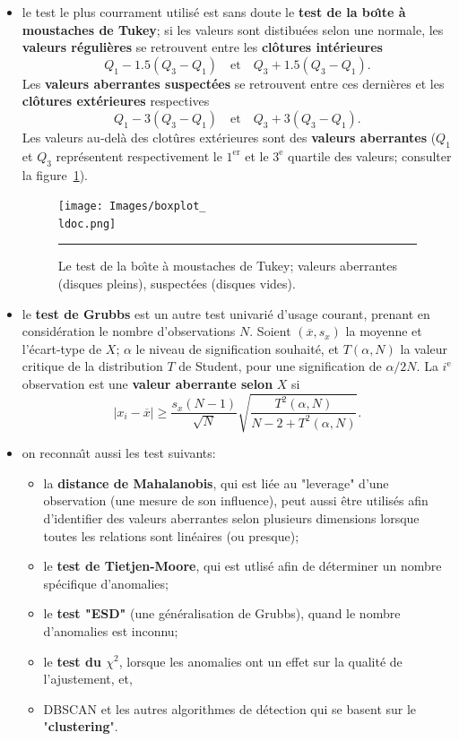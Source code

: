 \begin{itemize}[noitemsep]
\item le test le plus courrament utilis\'e est sans doute le  \textbf{test de la bo\^{\i}te \`a moustaches de Tukey}; si les valeurs sont distibu\'ees selon une normale, les \textbf{valeurs r\'e\-gu\-li\-\`eres} se retrouvent entre les \textbf{cl\^otures int\'erieures} $$Q_1-1.5(Q_3-Q_1) \quad\mbox{et}\quad Q_3+1.5(Q_3-Q_1).$$ Les \textbf{valeurs aberrantes suspect\'ees} se retrouvent entre ces derni\`eres et les \textbf{cl\^otures ext\'erieures} respectives 
$$Q_1-3(Q_3-Q_1) \quad\mbox{et}\quad Q_3+3(Q_3-Q_1).$$
Les valeurs au-del\`a des clot\^ures ext\'erieures sont des \textbf{valeurs aberrantes} ($Q_1$ et $Q_3$ repr\'esentent respectivement le $1^{\textrm{er}}$ et le $3^{\textrm{e}}$ quartile des valeurs; consulter la figure~\ref{fig:boxplot}).
\begin{figure}[t]
\centering
\texttt{[image: Images/boxplot\_\\ldoc.png]}
\caption{\small Le test de la bo\^{\i}te \`a moustaches de Tukey; valeurs aberrantes (disques pleins), suspect\'ees (disques vides).}
\hrule\label{fig:boxplot}
\end{figure}
\afterpage{\FloatBarrier}
\item le \textbf{test de Grubbs} est un autre test univari\'e d'usage courant, prenant en consid\'eration le nombre d'ob\-ser\-va\-tions $N$. Soient  $(\overline{x},s_x)$ la moyenne et l'\'ecart-type de $X$; $\alpha$ le niveau de signification souhait\'e, et $T(\alpha,N)$ la valeur critique de la distribution $T$ de Student, pour une signification de $\alpha/2N$. La $i^{\textrm{e}}$ ob\-ser\-va\-tion est une \textbf{valeur aberrante selon} $X$ si $$|x_i-\overline{x}| \geq \frac{s_x(N-1)}{\sqrt{N}}\sqrt{\frac{T^2(\alpha,N)}{N-2+T^2(\alpha,N)}}.$$
\item on reconna\^{\i}t aussi les test suivants:
\begin{itemize}[noitemsep]
\item la \textbf{distance de Mahalanobis}, qui est liée au "leverage" d'une ob\-ser\-va\-tion (une mesure de son influence), peut aussi être utilisés afin d'identifier des valeurs aberrantes selon plusieurs dimensions lorsque toutes les relations sont linéaires (ou presque);
\item le \textbf{test de Tietjen-Moore}, qui est utlis\'e afin de d\'eterminer un nombre sp\'ecifique d'anomalies;
\item le \textbf{test "ESD"} (une g\'en\'eralisation de Grubbs), quand le nombre d'anomalies est inconnu;
\item le \textbf{test du $\chi^2$}, lorsque les anomalies ont un effet sur la qualit\'e de l'ajustement, et,   
\item DBSCAN et les autres algorithmes de d\'etection qui se basent sur le "\textbf{clustering}". 
\end{itemize}
\end{itemize}
